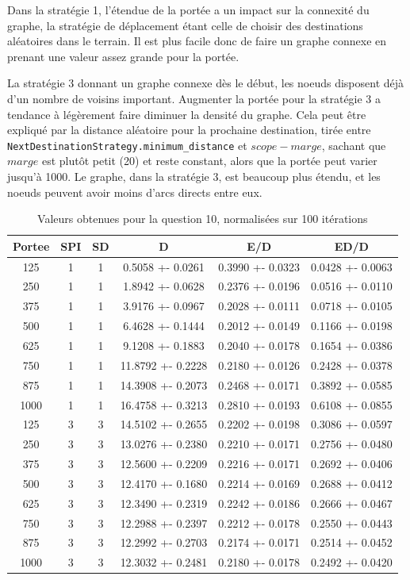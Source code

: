 \documentclass[a4paper]{article}
\begin{document}
Dans la stratégie 1, l'étendue de la portée a un impact sur la
connexité du graphe, la stratégie de déplacement étant celle de
choisir des destinations aléatoires dans le terrain. Il est plus
facile donc de faire un graphe connexe en prenant une valeur assez
grande pour la portée.

La stratégie 3 donnant un graphe connexe dès
le début, les noeuds disposent déjà d'un nombre de voisins important.
Augmenter la portée pour la stratégie 3 a tendance à légèrement faire
diminuer la densité du graphe. Cela peut être expliqué par la distance
aléatoire pour la prochaine destination, tirée entre
\texttt{NextDestinationStrategy.minimum\_distance} et $scope - marge$, sachant
que $marge$ est plutôt petit (20) et reste constant, alors que la
portée peut varier jusqu'à 1000. Le graphe, dans la stratégie 3, est beaucoup
plus étendu, et les noeuds peuvent avoir moins d'arcs directs
entre eux.
  \begin{table}[H]
    \centering
    \begin{tabular}{|c|c|c|c|c|c|}
      \hline
Portee & SPI & SD & D & E/D & ED/D \\
      \hline
125 & 1 & 1 & 0.5058 +- 0.0261 & 0.3990 +- 0.0323 & 0.0428 +- 0.0063 \\
250 & 1 & 1 & 1.8942 +- 0.0628 & 0.2376 +- 0.0196 & 0.0516 +- 0.0110 \\
375 & 1 & 1 & 3.9176 +- 0.0967 & 0.2028 +- 0.0111 & 0.0718 +- 0.0105 \\
500 & 1 & 1 & 6.4628 +- 0.1444 & 0.2012 +- 0.0149 & 0.1166 +- 0.0198 \\
625 & 1 & 1 & 9.1208 +- 0.1883 & 0.2040 +- 0.0178 & 0.1654 +- 0.0386 \\
750 & 1 & 1 & 11.8792 +- 0.2228 & 0.2180 +- 0.0126 & 0.2428 +- 0.0378 \\
875 & 1 & 1 & 14.3908 +- 0.2073 & 0.2468 +- 0.0171 & 0.3892 +- 0.0585 \\
1000& 1 & 1 & 16.4758 +- 0.3213 & 0.2810 +- 0.0193 & 0.6108 +- 0.0855 \\
\hline
125 & 3 & 3 & 14.5102 +- 0.2655 & 0.2202 +- 0.0198 & 0.3086 +- 0.0597 \\
250 & 3 & 3 & 13.0276 +- 0.2380 & 0.2210 +- 0.0171 & 0.2756 +- 0.0480 \\
375 & 3 & 3 & 12.5600 +- 0.2209 & 0.2216 +- 0.0171 & 0.2692 +- 0.0406 \\
500 & 3 & 3 & 12.4170 +- 0.1680 & 0.2214 +- 0.0169 & 0.2688 +- 0.0412 \\
625 & 3 & 3 & 12.3490 +- 0.2319 & 0.2242 +- 0.0186 & 0.2666 +- 0.0467 \\
750 & 3 & 3 & 12.2988 +- 0.2397 & 0.2212 +- 0.0178 & 0.2550 +- 0.0443 \\
875 & 3 & 3 & 12.2992 +- 0.2703 & 0.2174 +- 0.0171 & 0.2514 +- 0.0452 \\
1000& 3 & 3 & 12.3032 +- 0.2481 & 0.2180 +- 0.0178 & 0.2492 +- 0.0420 \\
\hline
    \end{tabular}
\caption{Valeurs obtenues pour la question 10, normalisées sur 100 itérations}
\end{table}
\end{document}
